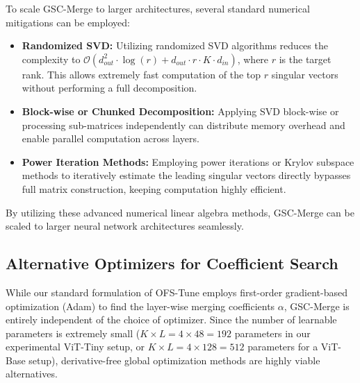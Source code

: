 To scale GSC-Merge to larger architectures, several standard numerical mitigations can be employed:
\begin{itemize}
    \item \textbf{Randomized SVD:} Utilizing randomized SVD algorithms \cite{halko2011finding} reduces the complexity to $\mathcal{O}(d_{out}^2 \cdot \log(r) + d_{out} \cdot r \cdot K \cdot d_{in})$, where $r$ is the target rank. This allows extremely fast computation of the top $r$ singular vectors without performing a full decomposition.
    \item \textbf{Block-wise or Chunked Decomposition:} Applying SVD block-wise or processing sub-matrices independently can distribute memory overhead and enable parallel computation across layers.
    \item \textbf{Power Iteration Methods:} Employing power iterations or Krylov subspace methods to iteratively estimate the leading singular vectors directly bypasses full matrix construction, keeping computation highly efficient.
\end{itemize}
By utilizing these advanced numerical linear algebra methods, GSC-Merge can be scaled to larger neural network architectures seamlessly.

\subsection{Alternative Optimizers for Coefficient Search}
\label{subsec:alternative_optimizers}

While our standard formulation of OFS-Tune employs first-order gradient-based optimization (Adam) to find the layer-wise merging coefficients $\alpha$, GSC-Merge is entirely independent of the choice of optimizer. Since the number of learnable parameters is extremely small ($K \times L = 4 \times 48 = 192$ parameters in our experimental ViT-Tiny setup, or $K \times L = 4 \times 128 = 512$ parameters for a ViT-Base setup), derivative-free global optimization methods are highly viable alternatives.

